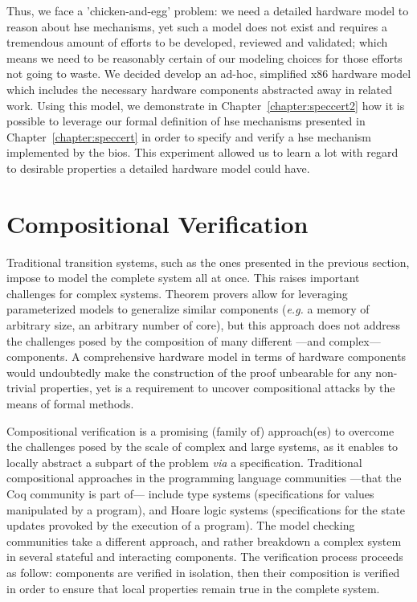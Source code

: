Thus, we face a 'chicken-and-egg' problem: we need a detailed hardware model to
reason about \ac{hse} mechanisms, yet such a model does not exist and requires a
tremendous amount of efforts to be developed, reviewed and validated; which
means we need to be reasonably certain of our modeling choices for those efforts
not going to waste.
%
We decided develop an ad-hoc, simplified x86 hardware model which includes the
necessary hardware components abstracted away in related work.
%
Using this model, we demonstrate in Chapter~\ref{chapter:speccert2} how it is
possible to leverage our formal definition of \ac{hse} mechanisms presented in
Chapter~\ref{chapter:speccert} in order to specify and verify a \ac{hse}
mechanism implemented by the \ac{bios}.
%
This experiment allowed us to learn a lot with regard to desirable properties a
detailed hardware model could have.

\section{Compositional Verification}
\label{section:sota:compsec}

Traditional transition systems, such as the ones presented in the previous
section, impose to model the complete system all at once.
%
This raises important challenges for complex systems.
%
Theorem provers allow for leveraging parameterized models to generalize similar
components (\emph{e.g.} a memory of arbitrary size, an arbitrary number of
core), but this approach does not address the challenges posed by the
composition of many different ---and complex--- components.
%
A comprehensive hardware model in terms of hardware components would undoubtedly
make the construction of the proof unbearable for any non-trivial properties,
yet is a requirement to uncover compositional attacks by the means of formal
methods.
%

Compositional verification is a promising (family of) approach(es) to overcome
the challenges posed by the scale of complex and large systems, as it enables to
locally abstract a subpart of the problem \emph{via} a specification.
%
Traditional compositional approaches in the programming language communities
---that the Coq community is part of--- include type
systems%
(specifications for values manipulated by a program), and Hoare logic systems
(specifications for the state updates provoked by the execution of a program).
%
The model checking communities take a different approach, and rather breakdown a
complex system in several stateful and interacting components.
%
The verification process proceeds as follow: components are verified in
isolation, then their composition is verified in order to ensure that local
properties remain true in the complete system.

